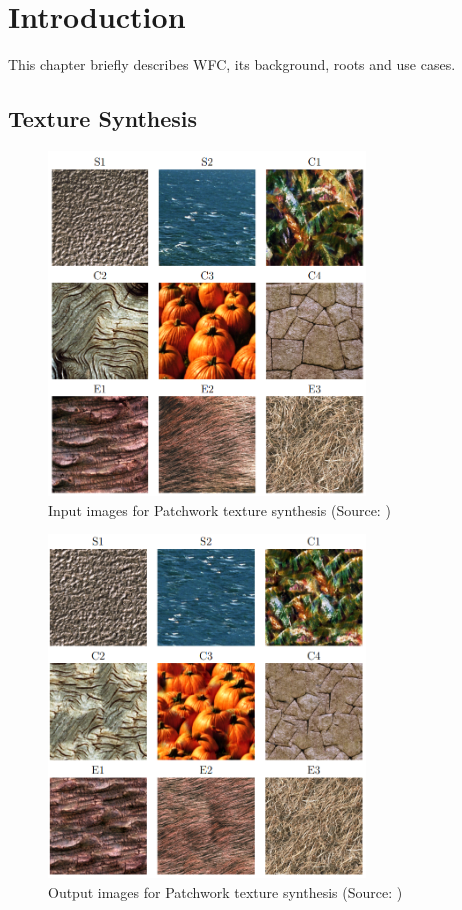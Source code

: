 \documentclass[shortabstract, english, inz]{iithesis}
\author         {Krzysztof Sławik}
\date          {03.02.2023}                     %
\begin{document}

\chapter{Introduction}
This chapter briefly describes WFC, its background, roots and use cases.
\section{Texture Synthesis}
\begin{figure}[H]
\centering
\includegraphics[width=0.75\textwidth, angle=0]{images/texsynth_input.png}
\caption{Input images for Patchwork texture synthesis (Source: \cite{harrison2002patchwork})}
\label{fig:texSynthIn}
\end{figure}
\begin{figure}[H]
\centering
\includegraphics[width=0.75\textwidth, angle=0]{images/texsynth_output.png}
\caption{Output images for Patchwork texture synthesis (Source: \cite{harrison2002patchwork})}
\label{fig:texSynthOut}
\end{figure}
\end{document}
